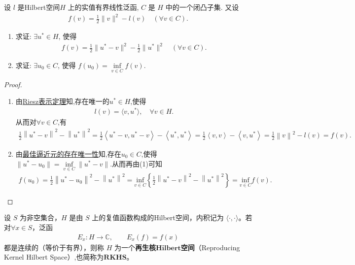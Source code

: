 \documentclass[../../main.tex]{subfiles}%
\begin{document}
\begin{example}
设 $l$ 是Hilbert空间$H$ 上的实值有界线性泛函, $C$ 是 $H$ 中的一个闭凸子集. 又设
\begin{align*}
f(v) = \frac{1}{2}\|v\|^2 - l(v) \quad (\forall v \in C).
\end{align*}
\begin{enumerate}[(1)]
\item 求证: $\exists u^* \in H$, 使得
\begin{align*}
f(v) = \frac{1}{2}\|u^* - v\|^2 - \frac{1}{2}\|u^*\|^2 \quad (\forall v \in C).
\end{align*}
\item 求证: $\exists u_0 \in C$, 使得 $f(u_0) = \inf\limits_{v \in C} f(v)$.
\end{enumerate}
\end{example}
\begin{proof}
\begin{enumerate}[(1)]
\item 由\hyperref[theorem:Riesz表示定理(Hilbert空间)]{Riesz表示定理}知,存在唯一的$u^*\in H$,使得
\begin{align*}
l(v) = \langle v,u^* \rangle,\quad \forall v\in H.
\end{align*}
从而对$\forall v\in C$,有
\begin{align*}
\frac{1}{2}\left\| u^*-v \right\| ^2-\left\| u^* \right\| ^2=\frac{1}{2}\left< u^*-v,u^*-v \right> -\left< u^*,u^* \right> =\frac{1}{2}\left< v,v \right> -\left< v,u^* \right> =\frac{1}{2}\left\| v \right\| ^2-l\left( v \right) =f\left( v \right) .
\end{align*}

\item 由\hyperref[corollary:泛函分析--最佳逼近元的存在唯一性]{最佳逼近元的存在唯一性}知,存在$u_0\in C$,使得$\|u^*-u_0\|=\inf\limits_{v \in C} \|u^* - v\|.$从而再由(1)可知
\begin{align*}
f(u_0) = \frac{1}{2}\left\| u^*-u_0 \right\| ^2-\left\| u^* \right\| ^2=\underset{v\in C}{\mathrm{inf}}\left\{ \frac{1}{2}\left\| u^*-v \right\| ^2-\left\| u^* \right\| ^2 \right\} =\underset{v\in C}{\mathrm{inf}}f\left( v \right) .
\end{align*}
\end{enumerate}
\end{proof}

\begin{definition}[再生核Hilbert空间]
设 $S$ 为非空集合，$H$ 是由 $S$ 上的复值函数构成的Hilbert空间，内积记为 $\langle \cdot,\cdot\rangle$。若对$\forall x\in S$，泛函
\begin{align*}
E_x:H\to \mathbb C,\qquad E_x(f)=f(x)
\end{align*}
都是连续的（等价于有界），则称 $H$ 为一个\textbf{再生核$\mathbf{Hilbert}$空间}（Reproducing Kernel Hilbert Space）,也简称为$\mathbf{RKHS}$。
\end{definition}
\end{document}
